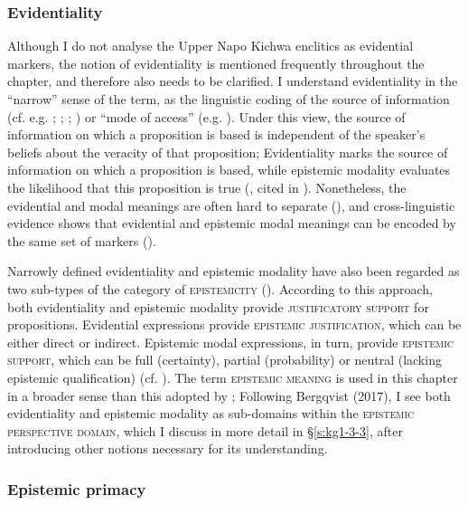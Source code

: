 \documentclass[output=paper]{langscibook}
\begin{document}
\subsubsection{Evidentiality}\label{s:kg1-3-1}

Although I do not analyse the Upper Napo Kichwa enclitics as evidential markers, the notion of evidentiality is mentioned frequently throughout the chapter, and therefore also needs to be clarified. I understand evidentiality in the “narrow” sense of the term, as the linguistic coding of the source of information (cf. e.g. \citealt[54]{Willett1988}; \citealt{Nikolaeva2000}; \citealt[342--343]{Dendale2001}; \citealt{Aikhenvald2004}) or “mode of access” (e.g. \citealt{GonzalezRuiz2016}). Under this view, the source of information on which a proposition is based is independent of the speaker’s beliefs about the veracity of that proposition; Evidentiality marks the source of information on which a proposition is based, while epistemic modality evaluates the likelihood that this proposition is true (\citealt{Cornille2009}, cited in \citealt{Fetzer2014}). Nonetheless, the evidential and modal meanings are often hard to separate (\citealt{Palmer2001}), and cross-linguistic evidence shows that evidential and epistemic modal meanings can be encoded by the same set of markers (\citealt[55]{Willett1988}). 

Narrowly defined evidentiality and epistemic modality have also been regarded as two sub-types of the category of \textsc{epistemicity} (\citealt{Boye2012}). According to this approach, both evidentiality and epistemic modality provide \textsc{justificatory support} for propositions. Evidential expressions provide \textsc{epistemic justification}, which can be either direct or indirect. Epistemic modal expressions, in turn, provide \textsc{epistemic support}, which can be full (certainty), partial (probability) or neutral (lacking epistemic qualification) (cf. \citealt[36]{Boye2012}). The term \textsc{epistemic meaning} is used in this chapter in a broader sense than this adopted by \cite[sec. 1.5]{Boye2012}; Following Bergqvist (2017), I see both evidentiality and epistemic modality as sub-domains within the \textsc{epistemic perspective domain}, which I discuss in more detail in §\ref{s:kg1-3-3}, after introducing other notions necessary for its understanding.  

\subsubsection{Epistemic primacy}\label{s:kg1-3-2}
\end{document}
